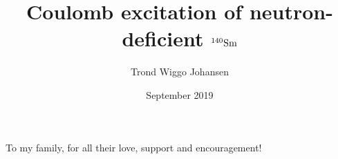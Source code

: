 \documentclass[twoside,english]{uiofysmaster/uiofysmaster}
\author{Trond Wiggo Johansen}
\title{Coulomb excitation of neutron-deficient $\textnormal{$^{140}$Sm}$}
\date{September 2019}
\begin{document}
\setlength{\belowdisplayskip}{12pt} \setlength{\belowdisplayshortskip}{12pt}
\setlength{\abovedisplayskip}{12pt} \setlength{\abovedisplayshortskip}{12pt}

\maketitle


\begin{abstract}


\end{abstract}


\begin{dedication}
To my family, for all their love, support and encouragement!

\end{dedication}
\end{document}

